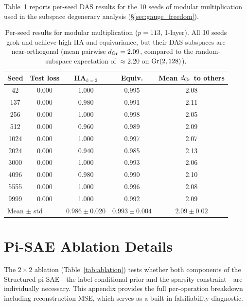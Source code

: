 Table~\ref{tab:seed_data} reports per-seed DAS results for the 10 seeds
of modular multiplication used in the subspace degeneracy analysis
(\S\ref{sec:gauge_freedom}).

\vspace{1em}
\begin{table}[H]
\centering
\small
\begin{tabular}{ccccc}
\toprule
\textbf{Seed} & \textbf{Test loss} & \textbf{IIA}$_{k{=}2}$ &
\textbf{Equiv.} & \textbf{Mean $d_{\mathrm{Gr}}$ to others} \\
\midrule
42   & 0.000 & 1.000 & 0.995 & 2.08 \\
137  & 0.000 & 0.980 & 0.991 & 2.11 \\
256  & 0.000 & 1.000 & 0.998 & 2.05 \\
512  & 0.000 & 0.960 & 0.989 & 2.09 \\
1024 & 0.000 & 1.000 & 0.997 & 2.07 \\
2024 & 0.000 & 0.940 & 0.985 & 2.13 \\
3000 & 0.000 & 1.000 & 0.993 & 2.06 \\
4096 & 0.000 & 0.980 & 0.990 & 2.10 \\
5555 & 0.000 & 1.000 & 0.996 & 2.08 \\
9999 & 0.000 & 1.000 & 0.992 & 2.09 \\
\midrule
\multicolumn{2}{l}{Mean $\pm$ std} & $0.986 \pm 0.020$ & $0.993 \pm 0.004$ &
$2.09 \pm 0.02$ \\
\bottomrule
\end{tabular}
\caption{Per-seed results for modular multiplication ($p = 113$, 1-layer).
All 10 seeds grok and achieve high IIA and equivariance, but their DAS
subspaces are near-orthogonal (mean pairwise $d_{\mathrm{Gr}} = 2.09$, compared to
the random-subspace expectation of $\approx 2.20$ on $\mathrm{Gr}(2, 128)$).}
\label{tab:seed_data}
\end{table}


\section{Pi-SAE Ablation Details}
\label{app:ablation}

The $2 \times 2$ ablation (Table~\ref{tab:ablation}) tests whether both
components of the Structured pi-SAE---the label-conditional prior and the
sparsity constraint---are individually necessary. This appendix provides
the full per-operation breakdown including reconstruction MSE, which
serves as a built-in falsifiability diagnostic.

